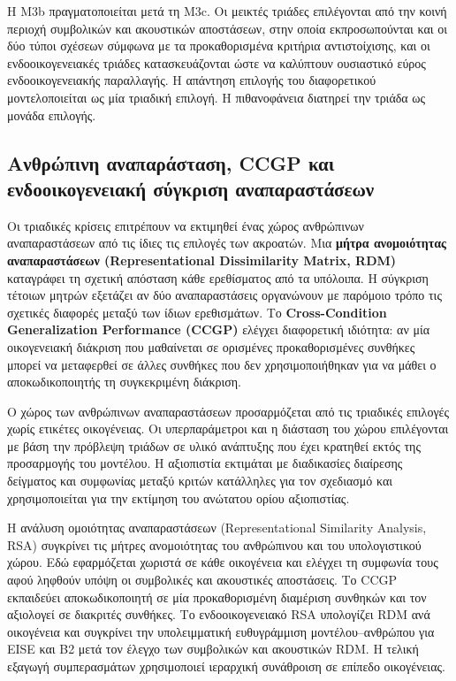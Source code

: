 \documentclass[11pt,a4paper]{article}
\begin{document}
Η M3b πραγματοποιείται μετά τη M3c. Οι μεικτές τριάδες επιλέγονται από την κοινή περιοχή συμβολικών και ακουστικών αποστάσεων, στην οποία εκπροσωπούνται και οι δύο τύποι σχέσεων σύμφωνα με τα προκαθορισμένα κριτήρια αντιστοίχισης, και οι ενδοοικογενειακές τριάδες κατασκευάζονται ώστε να καλύπτουν ουσιαστικό εύρος ενδοοικογενειακής παραλλαγής. Η απάντηση επιλογής του διαφορετικού μοντελοποιείται ως μία τριαδική επιλογή. Η πιθανοφάνεια διατηρεί την τριάδα ως μονάδα επιλογής.

\subsection{Ανθρώπινη αναπαράσταση, CCGP και ενδοοικογενειακή σύγκριση αναπαραστάσεων}\label{app:human-geometry}

Οι τριαδικές κρίσεις επιτρέπουν να εκτιμηθεί ένας χώρος ανθρώπινων αναπαραστάσεων από τις ίδιες τις επιλογές των ακροατών. Μια \textbf{μήτρα ανομοιότητας αναπαραστάσεων (Representational Dissimilarity Matrix, RDM)} καταγράφει τη σχετική απόσταση κάθε ερεθίσματος από τα υπόλοιπα. Η σύγκριση τέτοιων μητρών εξετάζει αν δύο αναπαραστάσεις οργανώνουν με παρόμοιο τρόπο τις σχετικές διαφορές μεταξύ των ίδιων ερεθισμάτων. Το \textbf{Cross-Condition Generalization Performance (CCGP)} ελέγχει διαφορετική ιδιότητα: αν μία οικογενειακή διάκριση που μαθαίνεται σε ορισμένες προκαθορισμένες συνθήκες μπορεί να μεταφερθεί σε άλλες συνθήκες που δεν χρησιμοποιήθηκαν για να μάθει ο αποκωδικοποιητής τη συγκεκριμένη διάκριση.

Ο χώρος των ανθρώπινων αναπαραστάσεων προσαρμόζεται από τις τριαδικές επιλογές χωρίς ετικέτες οικογένειας. Οι υπερπαράμετροι και η διάσταση του χώρου επιλέγονται με βάση την πρόβλεψη τριάδων σε υλικό ανάπτυξης που έχει κρατηθεί εκτός της προσαρμογής του μοντέλου. Η αξιοπιστία εκτιμάται με διαδικασίες διαίρεσης δείγματος και συμφωνίας μεταξύ κριτών κατάλληλες για τον σχεδιασμό και χρησιμοποιείται για την εκτίμηση του ανώτατου ορίου αξιοπιστίας.

Η ανάλυση ομοιότητας αναπαραστάσεων (Representational Similarity Analysis, RSA) συγκρίνει τις μήτρες ανομοιότητας του ανθρώπινου και του υπολογιστικού χώρου. Εδώ εφαρμόζεται χωριστά σε κάθε οικογένεια και ελέγχει τη συμφωνία τους αφού ληφθούν υπόψη οι συμβολικές και ακουστικές αποστάσεις. Το CCGP εκπαιδεύει αποκωδικοποιητή σε μία προκαθορισμένη διαμέριση συνθηκών και τον αξιολογεί σε διακριτές συνθήκες. Το ενδοοικογενειακό RSA υπολογίζει RDM ανά οικογένεια και συγκρίνει την υπολειμματική ευθυγράμμιση μοντέλου--ανθρώπου για EISE και B2 μετά τον έλεγχο των συμβολικών και ακουστικών RDM. Η τελική εξαγωγή συμπερασμάτων χρησιμοποιεί ιεραρχική συνάθροιση σε επίπεδο οικογένειας.
\end{document}
